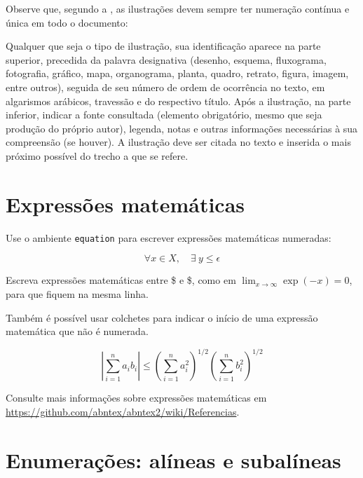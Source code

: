     Observe que, segundo a , as
    ilustrações devem sempre ter numeração contínua e única em todo o documento:

    \begin{citacao}
    Qualquer que seja o tipo de ilustração, sua identificação aparece na parte
    superior, precedida da palavra designativa (desenho, esquema, fluxograma,
    fotografia, gráfico, mapa, organograma, planta, quadro, retrato, figura,
    imagem, entre outros), seguida de seu número de ordem de ocorrência no texto,
    em algarismos arábicos, travessão e do respectivo título. Após a ilustração, na
    parte inferior, indicar a fonte consultada (elemento obrigatório, mesmo que
    seja produção do próprio autor), legenda, notas e outras informações
    necessárias à sua compreensão (se houver). A ilustração deve ser citada no
    texto e inserida o mais próximo possível do trecho a que se
    refere. \cite[seções 5.8]{NBR14724:2011}
    \end{citacao}

    \section{Expressões matemáticas}

    Use o ambiente \texttt{equation} para escrever
    expressões matemáticas numeradas:

    \begin{equation}
      \forall x \in X, \quad \exists \: y \leq \epsilon
    \end{equation}

    Escreva expressões matemáticas entre \$ e \$, como em $ \lim_{x \to \infty}
    \exp(-x) = 0 $, para que fiquem na mesma linha.

    Também é possível usar colchetes para indicar o início de uma expressão
    matemática que não é numerada.

    \[
    \left|\sum_{i=1}^n a_ib_i\right|
    \le
    \left(\sum_{i=1}^n a_i^2\right)^{1/2}
    \left(\sum_{i=1}^n b_i^2\right)^{1/2}
    \]

    Consulte mais informações sobre expressões matemáticas em
    \url{https://github.com/abntex/abntex2/wiki/Referencias}.


    \section{Enumerações: alíneas e subalíneas}

